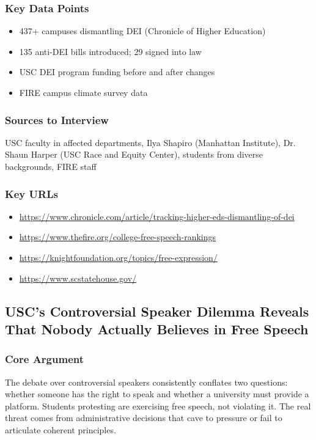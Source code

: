 \documentclass[11pt,letterpaper]{article}
\begin{document}
\subsubsection*{Key Data Points}
\begin{itemize}[noitemsep]
    \item 437+ campuses dismantling DEI (Chronicle of Higher Education)
    \item 135 anti-DEI bills introduced; 29 signed into law
    \item USC DEI program funding before and after changes
    \item FIRE campus climate survey data
\end{itemize}

\subsubsection*{Sources to Interview}
USC faculty in affected departments, Ilya Shapiro (Manhattan Institute), Dr. Shaun Harper (USC Race and Equity Center), students from diverse backgrounds, FIRE staff

\subsubsection*{Key URLs}
\begin{itemize}[noitemsep]
    \item \url{https://www.chronicle.com/article/tracking-higher-eds-dismantling-of-dei}
    \item \url{https://www.thefire.org/college-free-speech-rankings}
    \item \url{https://knightfoundation.org/topics/free-expression/}
    \item \url{https://www.scstatehouse.gov/}
\end{itemize}

\newpage
\subsection{USC's Controversial Speaker Dilemma Reveals That Nobody Actually Believes in Free Speech}

\subsubsection*{Core Argument}
The debate over controversial speakers consistently conflates two questions: whether someone has the right to speak and whether a university must provide a platform. Students protesting are exercising free speech, not violating it. The real threat comes from administrative decisions that cave to pressure or fail to articulate coherent principles.
\end{document}
